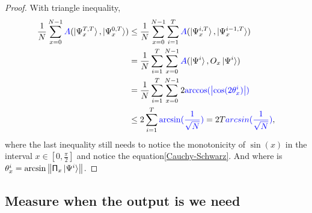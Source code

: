 \documentclass[a4paper,10pt]{article}
\numberwithin{equation}{subsection}
\begin{document}
\begin{proof}
    With triangle inequality,
    \begin{equation}
        \begin{split}
            \frac{1}{N}\sum_{x=0}^{N-1}\textcolor{blue}{A}(\ket{\Psi_{x}^{T,T}},\ket{\Psi_{x}^{0,T}})
             & \leq \frac{1}{N}\sum_{x=0}^{N-1}\sum_{i=1}^{T}\textcolor{blue}{A}(\ket{\Psi_{x}^{i,T}},\ket{\Psi_{x}^{i-1,T}})      \\
             & = \frac{1}{N}\sum_{i=1}^{T}\sum_{x=0}^{N-1}\textcolor{blue}{A}(\ket{\Psi^{i}},O_{x}\ket{\Psi^{i}})                  \\
             & = \frac{1}{N}\sum_{i=1}^{T}\sum_{x=0}^{N-1}2\textcolor{blue}{\arccos(\left\lvert\cos(2\theta_{x}^{i})\right\rvert)} \\
             & \leq 2\sum_{i=1}^{T}\textcolor{blue}{\arcsin(\frac{1}{\sqrt{N}})} = 2T\textcolor{blue}{arcsin(\frac{1}{\sqrt{N}})},
        \end{split}
    \end{equation}
    where the last inequality still needs to notice the monotonicity of $\sin(x)$ in the interval $x\in\left[0,\frac{\pi}{2}\right]$ and notice the equation\ref{Cauchy-Schwarz}. And where is $\theta_{x}^{i}=\arcsin\left\| \mathsf{\Pi}_{x}\ket{\Psi^{i}}\right\|$.
\end{proof}



\subsection{Measure when the output is we need}




\end{document}
